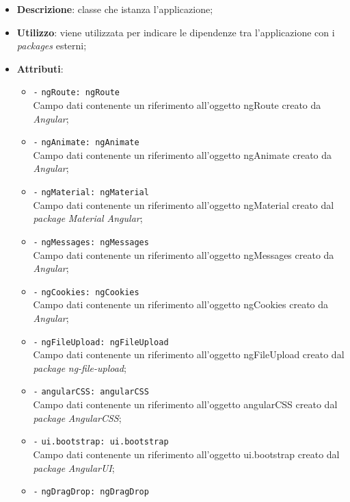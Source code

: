 		\begin{itemize}

			\item \textbf{Descrizione}: classe che istanza l'applicazione;
			\item \textbf{Utilizzo}: viene utilizzata per indicare le dipendenze tra l'applicazione con i \textit{packages} esterni;

			\item \textbf{Attributi}: 
			\begin{itemize}
				\item \texttt{-} \texttt{ngRoute: ngRoute} \\
				Campo dati contenente un riferimento all'oggetto ngRoute creato da \textit{Angular};
				\item \texttt{-} \texttt{ngAnimate: ngAnimate} \\
				Campo dati contenente un riferimento all'oggetto ngAnimate creato da \textit{Angular};
				\item \texttt{-} \texttt{ngMaterial: ngMaterial} \\
				Campo dati contenente un riferimento all'oggetto ngMaterial creato dal \textit{package} \textit{Material Angular};
				\item \texttt{-} \texttt{ngMessages: ngMessages} \\
				Campo dati contenente un riferimento all'oggetto ngMessages creato da \textit{Angular};
				\item \texttt{-} \texttt{ngCookies: ngCookies} \\
				Campo dati contenente un riferimento all'oggetto ngCookies creato da \textit{Angular};
				\item \texttt{-} \texttt{ngFileUpload: ngFileUpload} \\
				Campo dati contenente un riferimento all'oggetto ngFileUpload creato dal \textit{package} \textit{ng-file-upload};
				\item \texttt{-} \texttt{angularCSS: angularCSS} \\
				Campo dati contenente un riferimento all'oggetto angularCSS creato dal \textit{package} \textit{AngularCSS};
				\item \texttt{-} \texttt{ui.bootstrap: ui.bootstrap} \\
				Campo dati contenente un riferimento all'oggetto ui.bootstrap creato dal \textit{package} \textit{AngularUI};
				\item \texttt{-} \texttt{ngDragDrop: ngDragDrop} \\

\end{itemize}
\end{itemize}
